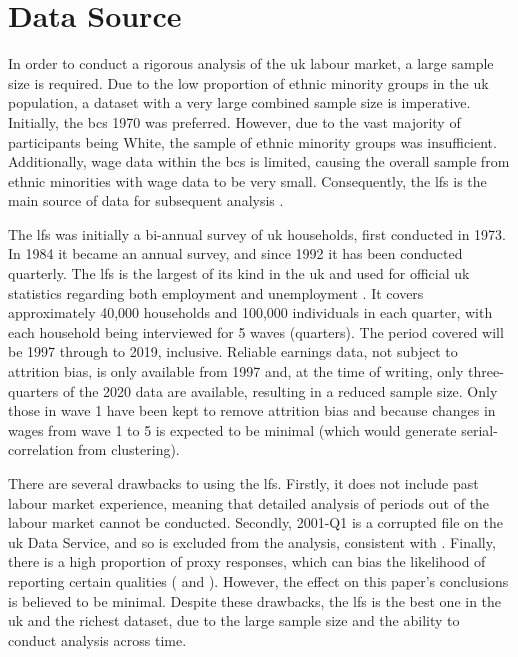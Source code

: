 \documentclass[class=article, crop=false]{standalone}
\begin{document}
\section{Data Source}
\label{sec:Data}
In order to conduct a rigorous analysis of the \acrshort{uk} labour market, a large sample size is required. Due to the low proportion of ethnic minority groups in the \acrshort{uk} population, a dataset with a very large combined sample size is imperative. Initially, the \acrfull{bcs} 1970 was preferred. However, due to the vast majority of participants being White, the sample of ethnic minority groups was insufficient. Additionally, wage data within the \acrshort{bcs} is limited, causing the overall sample from ethnic minorities with wage data to be very small. Consequently, the \acrfull{lfs} is the main source of data for subsequent analysis \citep{ONSk}.

The \acrshort{lfs} was initially a bi-annual survey of \acrshort{uk} households, first conducted in 1973. In 1984 it became an annual survey, and since 1992 it has been conducted quarterly. The \acrshort{lfs} is the largest of its kind in the \acrshort{uk} and used for official \acrshort{uk} statistics regarding both employment and unemployment \citep{ONS}. It covers approximately 40,000 households and 100,000 individuals in each quarter, with each household being interviewed for 5 waves (quarters). The period covered will be 1997 through to 2019, inclusive. Reliable earnings data, not subject to attrition bias, is only available from 1997 \citep{ONSa} and, at the time of writing, only three-quarters of the 2020 data are available, resulting in a reduced sample size. Only those in wave 1 have been kept to remove attrition bias and because changes in wages from wave 1 to 5 is expected to be minimal (which would generate serial-correlation from clustering).


There are several drawbacks to using the \acrshort{lfs}. Firstly, it does not include past labour market experience, meaning that detailed analysis of periods out of the labour market cannot be conducted. Secondly, 2001-Q1 is a corrupted file on the \acrshort{uk} Data Service, and so is excluded from the analysis, consistent with \citet{Longhi}. Finally, there is a high proportion of proxy responses, which can bias the likelihood of reporting certain qualities (\citet{Clarke} and \citet{Davies}). However, the effect on this paper's conclusions is believed to be minimal. Despite these drawbacks, the \acrshort{lfs} is the best one in the \acrshort{uk} and the richest dataset, due to the large sample size and the ability to conduct analysis across time.
\end{document}
